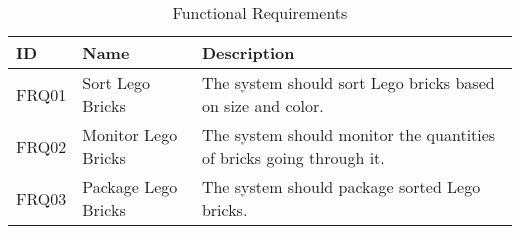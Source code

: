 \begin{table}[h]
    \caption{Functional Requirements}
    \label{tab:functionalReq}
    \centering
    \begin{tabular}{|l|l|p{4cm}|}
    \hline
    ID & Name                   & Description                \\
    \hline
    FRQ01 & Sort Lego Bricks       & The system should sort Lego bricks based on size and color.     \\
    \hline
    FRQ02 & Monitor Lego Bricks   & The system should monitor the quantities of bricks going through it.  \\
    \hline
    FRQ03 & Package Lego Bricks  & The system should package sorted Lego bricks.   \\
    \hline
\end{tabular}
\end{table}